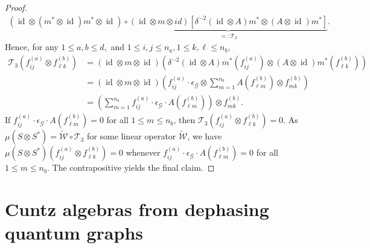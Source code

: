 \documentclass[11pt]{article}
\theoremstyle{plain}
\theoremstyle{nonumberplain}
\theoremstyle{plain}
\theoremstyle{nonumberplain}
\newtheorem{proof}{Proof.}
\DeclareMathOperator{\id}{id}
\newcommand\1{{\bf 1}}
\newcommand\cG{{\mathcal G}}
\newcommand{\<}{\left\langle}
\renewcommand{\>}{\right\rangle}
\begin{document}
\begin{proof}
\begin{align*}
    (\id \otimes (m^*\otimes \id)m^*\otimes \id)\circ 
    \underbrace{(\id \otimes m\otimes id)[\delta^{-2}(\id\otimes A)m^* \otimes (A\otimes \id)m^*]}_{=:\mathcal{T}_3}.
    \end{align*}
Hence, for any $1\leq a,b\leq d,$ and $1\leq i,j\leq n_a,1\leq k,\ell\leq n_b,$ %
\begin{align*}
    \mathcal{T}_3(f_{ij}^{(a)}\otimes f_{\ell k}^{(b)})
    &=
     (\id \otimes m\otimes \id)\left(\delta^{-2}(\id \otimes A)m^*(f_{ij}^{(a)})\otimes (A\otimes \id)m^*(f_{\ell k}^{(b)})\right)\\
    &= (\id \otimes m\otimes \id)
    \left(f_{ij}^{(a)}\cdot \epsilon_{\cG} \otimes \sum_{m=1}^{n_b} A(f_{\ell m}^{(b)})\otimes f_{mk}^{(b)}\right)\\
    &=
    \left(\sum_{m=1}^{n_b} f_{ij}^{(a)}\cdot \epsilon_{\cG} \cdot A(f_{\ell m}^{(b)})\right)\otimes f_{mk}^{(b)}.
\end{align*}
If $f_{ij}^{(a)}\cdot \epsilon_{\cG}\cdot A(f_{\ell m}^{(b)})=0$ for all $1\leq m\leq n_b$, then $\mathcal{T}_3(f_{ij}^{(a)}\otimes f_{\ell k}^{(b)}) = 0$. As $\mu(S\otimes S^*) = \widetilde{\mathcal{W}}\circ \mathcal{T}_3$ for some linear operator $\widetilde{\mathcal{W}}$, we have $\mu(S\otimes S^*)(f_{ij}^{(a)}\otimes f_{\ell k}^{(b)}) = 0$ whenever $f^{(a)}_{ij}\cdot \epsilon_\cG\cdot A(f_{\ell m}^{(b)}) = 0 $ for all $1\leq m\leq n_b$. The contrapositive yields the final claim.
\end{proof}










\section{Cuntz algebras from dephasing quantum graphs}\label{sec:cuntz_algebra_embedding_theorem}
\end{document}
